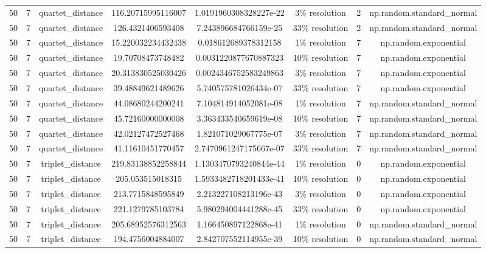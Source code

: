 \begin{longtable}{||c c c c c c c c||}
         50 & 7 & quartet\_distance & 116.20715995116007 & 1.0191960308328227e-22 & 3\% resolution & 2 & np.random.standard\_normal \\
         50 & 7 & quartet\_distance & 126.4321406593408 & 7.243896684766159e-25 & 33\% resolution & 2 & np.random.standard\_normal \\
         50 & 7 & quartet\_distance & 15.220032234432438 & 0.018612689378312158 & 1\% resolution & 7 & np.random.exponential \\
         50 & 7 & quartet\_distance & 19.70708473748482 & 0.0031220877670887323 & 10\% resolution & 7 & np.random.exponential \\
         50 & 7 & quartet\_distance & 20.313830525030426 & 0.0024346752583249863 & 3\% resolution & 7 & np.random.exponential \\
         50 & 7 & quartet\_distance & 39.48849621489626 & 5.740575781026434e-07 & 33\% resolution & 7 & np.random.exponential \\
         50 & 7 & quartet\_distance & 44.08680244200241 & 7.104814914052081e-08 & 1\% resolution & 7 & np.random.standard\_normal \\
         50 & 7 & quartet\_distance & 45.72160000000008 & 3.363433540659619e-08 & 10\% resolution & 7 & np.random.standard\_normal \\
         50 & 7 & quartet\_distance & 42.02127472527468 & 1.821071029067775e-07 & 3\% resolution & 7 & np.random.standard\_normal \\
         50 & 7 & quartet\_distance & 41.11610451770457 & 2.7470961247175667e-07 & 33\% resolution & 7 & np.random.standard\_normal \\
         50 & 7 & triplet\_distance & 219.83138852258844 & 1.1303470793240844e-44 & 1\% resolution & 0 & np.random.exponential \\
         50 & 7 & triplet\_distance & 205.053515018315 & 1.5933482718201433e-41 & 10\% resolution & 0 & np.random.exponential \\
         50 & 7 & triplet\_distance & 213.7715848595849 & 2.213227108213196e-43 & 3\% resolution & 0 & np.random.exponential \\
         50 & 7 & triplet\_distance & 221.1279785103784 & 5.980294004441288e-45 & 33\% resolution & 0 & np.random.exponential \\
         50 & 7 & triplet\_distance & 205.68952576312563 & 1.166450897122868e-41 & 1\% resolution & 0 & np.random.standard\_normal \\
         50 & 7 & triplet\_distance & 194.4756004884007 & 2.842707552114955e-39 & 10\% resolution & 0 & np.random.standard\_normal \\

\end{longtable}
